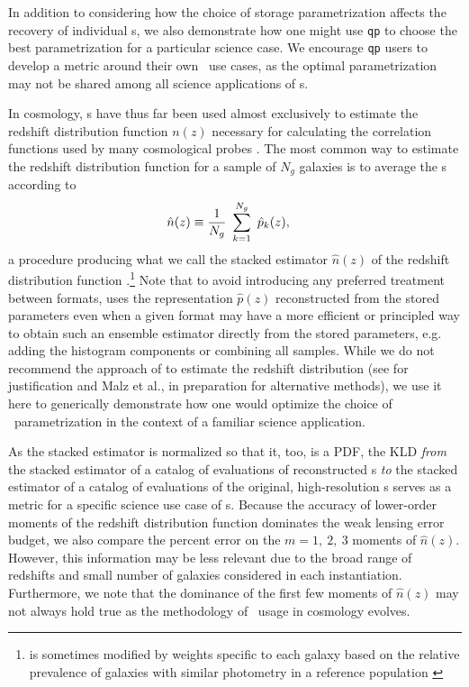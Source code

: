 In addition to considering how the choice of storage parametrization affects 
the recovery of individual \pz s, we also demonstrate how one might use 
\texttt{qp} to choose the best parametrization for a particular science case.
We encourage \texttt{qp} users to develop a metric around their own \pz\ use 
cases, as the optimal parametrization may not be shared among all science 
applications of \pz s.

In cosmology, \pz s have thus far been used almost exclusively to estimate the 
redshift distribution function $n(z)$ necessary for calculating the correlation 
functions used by many cosmological probes \citep{clampitt_galaxygalaxy_2017, 
	hildebrandt_kids-450:_2017}.
The most common way to estimate the redshift distribution function for a sample 
of $N_{g}$ galaxies is to average the \pz s according to
\begin{align}
\eqlabel{eq:nz}
\hat{n}(z) &\equiv \frac{1}{N_{g}}\ \sum_{k=1}^{N_{g}}\ \hat{p}_{k}(z),
\end{align}
a procedure producing what we call the stacked estimator $\hat{n}(z)$ of the 
redshift distribution function \citep{harnois-deraps_kids-450:_2017, 
	hoyle_dark_2017}.\footnote{
	 is sometimes modified by weights specific to each galaxy 
	based on the relative prevalence of galaxies with similar photometry in a 
	reference population \citep{sheldon_photometric_2012, 
		troster_cross-correlation_2017}
}
Note that to avoid introducing any preferred treatment between formats, 
 uses the representation $\hat{p}(z)$ reconstructed from 
the stored parameters even when a given format may have a more efficient or 
principled way to obtain such an ensemble estimator directly from the stored 
parameters, e.g. adding the histogram components or combining all samples.
While we do not recommend the approach of  to estimate the 
redshift distribution (see \citet{choi_cfhtlens_2016} for justification and 
Malz et al., in preparation for alternative methods), we use it here to 
generically demonstrate how one would optimize the choice of \pz\ 
parametrization in the context of a familiar science application.

As the stacked estimator is normalized so that it, too, is a PDF, the KLD 
\textit{from} the stacked estimator of a catalog of evaluations of 
reconstructed \pz s \textit{to} the stacked estimator of a catalog of 
evaluations of the original, high-resolution \pz s serves as a metric for a 
specific science use case of \pz s.
Because the accuracy of lower-order moments of the redshift distribution 
function dominates the weak lensing error budget, we also compare the percent 
error on the $m=1,\ 2,\ 3$ moments of $\hat{n}(z)$.
However, this information may be less relevant due to the broad range of 
redshifts and small number of galaxies considered in each instantiation.
Furthermore, we note that the dominance of the first few moments of 
$\hat{n}(z)$ may not always hold true as the methodology of \pz\ usage in 
cosmology evolves.


